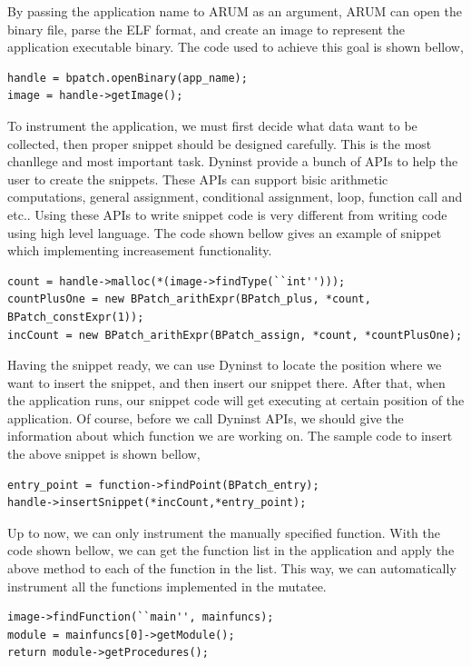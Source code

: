 \documentclass[11pt,letterpaper,oneside]{article}
\begin{document}
By passing the application name to ARUM as an argument, ARUM can open the binary file, parse the ELF format, and create an image to represent the application executable binary. The code used to achieve this goal is shown bellow,
\begin{Verbatim}[frame=single]
handle = bpatch.openBinary(app_name);
image = handle->getImage();
\end{Verbatim}

To instrument the application, we must first decide what data want to be collected, then proper snippet should be designed carefully. This is the most chanllege and most important task. Dyninst provide a bunch of APIs to help the user to create the snippets. These APIs can support bisic arithmetic computations, general assignment, conditional assignment, loop, function call and etc.. Using these APIs to write snippet code is very different from writing code using high level language. The code shown bellow gives an example of snippet which implementing increasement functionality.
\begin{Verbatim}[frame=single]
count = handle->malloc(*(image->findType(``int'')));
countPlusOne = new BPatch_arithExpr(BPatch_plus, *count, BPatch_constExpr(1));
incCount = new BPatch_arithExpr(BPatch_assign, *count, *countPlusOne);
\end{Verbatim}

Having the snippet ready, we can use Dyninst to locate the position where we want to insert the snippet, and then insert our snippet there. After that, when the application runs, our snippet code will get executing at certain position of the application. Of course, before we call Dyninst APIs, we should give the information about which function we are working on. The sample code to insert the above snippet is shown bellow,
\begin{Verbatim}[frame=single]
entry_point = function->findPoint(BPatch_entry);
handle->insertSnippet(*incCount,*entry_point);
\end{Verbatim}

Up to now, we can only instrument the manually specified function. With the code shown bellow, we can get the function list in the application and apply the above method to each of the function in the list. This way, we can automatically instrument all the functions implemented in the mutatee.
\begin{Verbatim}[frame=single]
image->findFunction(``main'', mainfuncs);
module = mainfuncs[0]->getModule();
return module->getProcedures();
\end{Verbatim}
\end{document}
